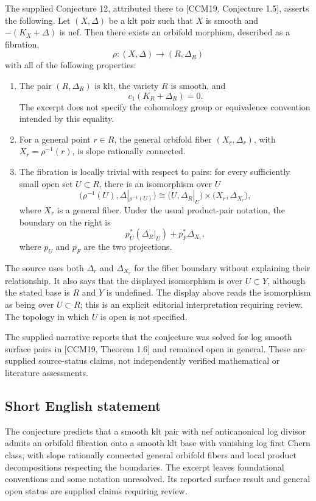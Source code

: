 \documentclass[11pt]{article}
\begin{document}
The supplied Conjecture 12, attributed there to [CCM19, Conjecture 1.5], asserts the following. Let \((X,\Delta)\) be a klt pair such that \(X\) is smooth and \(-(K_X+\Delta)\) is nef. Then there exists an orbifold morphism, described as a fibration,
\[
\rho:(X,\Delta)\longrightarrow(R,\Delta_R)
\]
with all of the following properties:
\begin{enumerate}
\item The pair \((R,\Delta_R)\) is klt, the variety \(R\) is smooth, and
\[
c_1(K_R+\Delta_R)=0.
\]
The excerpt does not specify the cohomology group or equivalence convention intended by this equality.
\item For a general point \(r\in R\), the general orbifold fiber \((X_r,\Delta_r)\), with \(X_r=\rho^{-1}(r)\), is slope rationally connected.
\item The fibration is locally trivial with respect to pairs: for every sufficiently small open set \(U\subset R\), there is an isomorphism over \(U\)
\[
\bigl(\rho^{-1}(U),\Delta|_{\rho^{-1}(U)}\bigr)
\cong
\bigl(U,\Delta_R|_U\bigr)\times\bigl(X_r,\Delta_{X_r}\bigr),
\]
where \(X_r\) is a general fiber. Under the usual product-pair notation, the boundary on the right is
\[
p_U^*(\Delta_R|_U)+p_F^*\Delta_{X_r},
\]
where \(p_U\) and \(p_F\) are the two projections.
\end{enumerate}
The source uses both \(\Delta_r\) and \(\Delta_{X_r}\) for the fiber boundary without explaining their relationship. It also says that the displayed isomorphism is over \(U\subset Y\), although the stated base is \(R\) and \(Y\) is undefined. The display above reads the isomorphism as being over \(U\subset R\); this is an explicit editorial interpretation requiring review. The topology in which \(U\) is open is not specified.

The supplied narrative reports that the conjecture was solved for log smooth surface pairs in [CCM19, Theorem 1.6] and remained open in general. These are supplied source-status claims, not independently verified mathematical or literature assessments.
\subsection{Short English statement}
The conjecture predicts that a smooth klt pair with nef anticanonical log divisor admits an orbifold fibration onto a smooth klt base with vanishing log first Chern class, with slope rationally connected general orbifold fibers and local product decompositions respecting the boundaries. The excerpt leaves foundational conventions and some notation unresolved. Its reported surface result and general open status are supplied claims requiring review.
\end{document}
